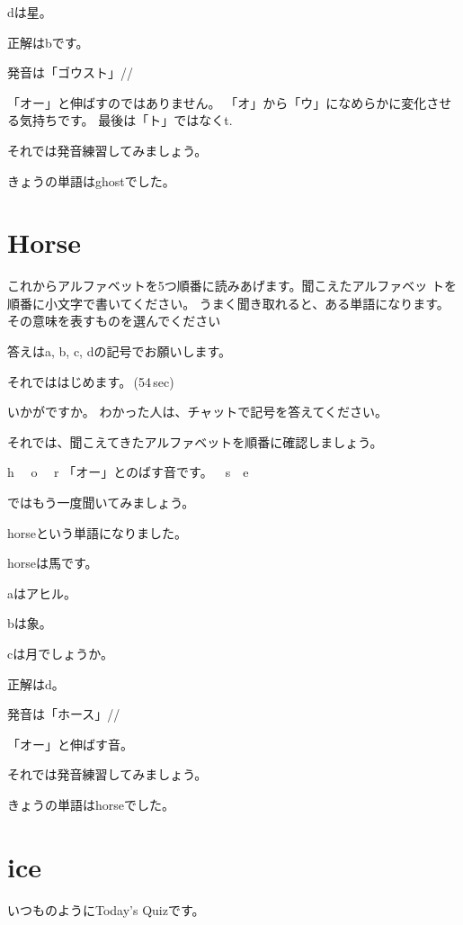 \documentclass[12pt]{jlreq}
\let\textipa\undefined
\newcommand{\myMouse}{%
  {\large \ComputerMouse}
}
\begin{document}
dは星。

正解はbです。


発音は「ゴウスト」/\textipa{g\'oUst}/

「オー」と伸ばすのではありません。
「オ」から「ウ」になめらかに変化させる気持ちです。
最後は「ト」ではなくt.

それでは発音練習してみましょう。

きょうの単語はghostでした。
\newpage
\section{Horse}

これからアルファベットを5つ順番に読みあげます。聞こえたアルファベッ
トを順番に小文字で書いてください。
うまく聞き取れると、ある単語になります。
その意味を表すものを選んでください

答えはa, b, c, dの記号でお願いします。

それでははじめます。\faVolumeUp\,(54\,sec)

いかがですか。
わかった人は、チャットで記号を答えてください。

それでは、聞こえてきたアルファベットを順番に確認しましょう。{\large \ComputerMouse}

h\,\,
{\large \ComputerMouse}\,\,
o\,\,
{\large \ComputerMouse}\,\,
r\,\,「オー」とのばす音です。
{\large \ComputerMouse}\,\,
s
\myMouse\,\,
e

ではもう一度聞いてみましょう。


horseという単語になりました。

horseは馬です。

aはアヒル。

bは象。

cは月でしょうか。

正解はd。



発音は「ホース」/\textipa{h\textopeno\textlengthmark{}{r}s}/

「オー」と伸ばす音。

それでは発音練習してみましょう。

きょうの単語はhorseでした。
\newpage
\section{ice}
いつものようにToday's Quizです。
\end{document}
